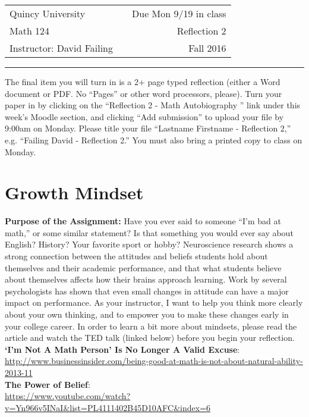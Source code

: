 \documentclass{article}
\begin{document}
\begin{tabular}{lcr}
Quincy University & \hspace{3in} & Due Mon 9/19 in class\\
Math 124 & \hspace{3in} & Reflection 2\\
Instructor: David Failing & \hspace{3in} & Fall 2016
\end{tabular}

\hrule

\vspace{\baselineskip}

The final item you will turn in is a 2+ page typed reflection (either a Word document or PDF. No ``Pages'' or other word processors, please). Turn your paper in by clicking on the ``Reflection 2 - Math Autobiography '' link under this week's Moodle section, and clicking ``Add submission'' to upload your file by 9:00am on Monday. Please title your file ``Lastname Firstname - Reflection 2,'' e.g. ``Failing David - Reflection 2.'' You must also bring a printed copy to class on Monday.

\section*{Growth Mindset}

\noindent\textbf{Purpose of the Assignment:} Have you ever said to someone ``I'm bad at math,'' or some similar statement? Is that something you would ever say about English? History? Your favorite sport or hobby? Neuroscience research shows a strong connection between the attitudes and beliefs students hold about themselves and their academic performance, and that what students believe about themselves affects how their brains approach learning. Work by several psychologists has shown that even small changes in attitude can have a major impact on performance. As your instructor, I want to help you think more clearly about your own thinking, and to empower you to make these changes early in your college career. In order to learn a bit more about mindsets, please read the article and watch the TED talk (linked below) before you begin your reflection.\\

\noindent\textbf{`I'm Not A Math Person' Is No Longer A Valid Excuse}:\\ \url{http://www.businessinsider.com/being-good-at-math-is-not-about-natural-ability-2013-11}\\
\textbf{The Power of Belief}:\\ \url{https://www.youtube.com/watch?v=Yn966v5INaI&list=PL4111402B45D10AFC&index=6}\\
\end{document}

